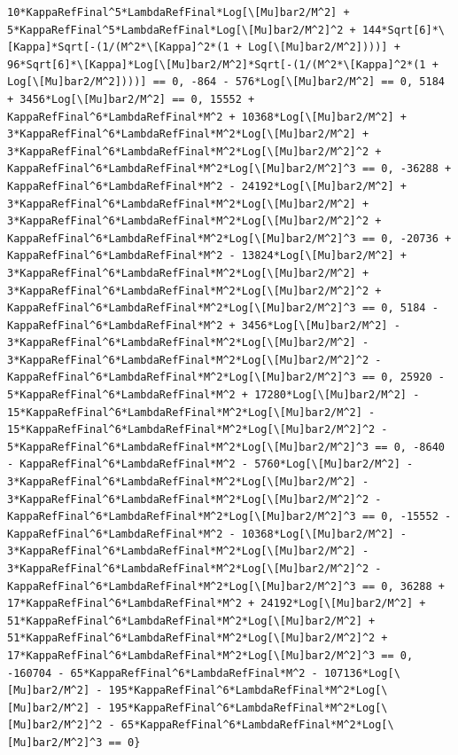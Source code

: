 \documentclass[11pt]{article}
\begin{document}
\begin{verbatim}
10*KappaRefFinal^5*LambdaRefFinal*Log[\[Mu]bar2/M^2] + 5*KappaRefFinal^5*LambdaRefFinal*Log[\[Mu]bar2/M^2]^2 + 144*Sqrt[6]*\[Kappa]*Sqrt[-(1/(M^2*\[Kappa]^2*(1 + Log[\[Mu]bar2/M^2])))] + 96*Sqrt[6]*\[Kappa]*Log[\[Mu]bar2/M^2]*Sqrt[-(1/(M^2*\[Kappa]^2*(1 + Log[\[Mu]bar2/M^2])))] == 0, -864 - 576*Log[\[Mu]bar2/M^2] == 0, 5184 + 3456*Log[\[Mu]bar2/M^2] == 0, 15552 + KappaRefFinal^6*LambdaRefFinal*M^2 + 10368*Log[\[Mu]bar2/M^2] + 3*KappaRefFinal^6*LambdaRefFinal*M^2*Log[\[Mu]bar2/M^2] + 3*KappaRefFinal^6*LambdaRefFinal*M^2*Log[\[Mu]bar2/M^2]^2 + KappaRefFinal^6*LambdaRefFinal*M^2*Log[\[Mu]bar2/M^2]^3 == 0, -36288 + KappaRefFinal^6*LambdaRefFinal*M^2 - 24192*Log[\[Mu]bar2/M^2] + 3*KappaRefFinal^6*LambdaRefFinal*M^2*Log[\[Mu]bar2/M^2] + 3*KappaRefFinal^6*LambdaRefFinal*M^2*Log[\[Mu]bar2/M^2]^2 + KappaRefFinal^6*LambdaRefFinal*M^2*Log[\[Mu]bar2/M^2]^3 == 0, -20736 + KappaRefFinal^6*LambdaRefFinal*M^2 - 13824*Log[\[Mu]bar2/M^2] + 3*KappaRefFinal^6*LambdaRefFinal*M^2*Log[\[Mu]bar2/M^2] + 3*KappaRefFinal^6*LambdaRefFinal*M^2*Log[\[Mu]bar2/M^2]^2 + KappaRefFinal^6*LambdaRefFinal*M^2*Log[\[Mu]bar2/M^2]^3 == 0, 5184 - KappaRefFinal^6*LambdaRefFinal*M^2 + 3456*Log[\[Mu]bar2/M^2] - 3*KappaRefFinal^6*LambdaRefFinal*M^2*Log[\[Mu]bar2/M^2] - 3*KappaRefFinal^6*LambdaRefFinal*M^2*Log[\[Mu]bar2/M^2]^2 - KappaRefFinal^6*LambdaRefFinal*M^2*Log[\[Mu]bar2/M^2]^3 == 0, 25920 - 5*KappaRefFinal^6*LambdaRefFinal*M^2 + 17280*Log[\[Mu]bar2/M^2] - 15*KappaRefFinal^6*LambdaRefFinal*M^2*Log[\[Mu]bar2/M^2] - 15*KappaRefFinal^6*LambdaRefFinal*M^2*Log[\[Mu]bar2/M^2]^2 - 5*KappaRefFinal^6*LambdaRefFinal*M^2*Log[\[Mu]bar2/M^2]^3 == 0, -8640 - KappaRefFinal^6*LambdaRefFinal*M^2 - 5760*Log[\[Mu]bar2/M^2] - 3*KappaRefFinal^6*LambdaRefFinal*M^2*Log[\[Mu]bar2/M^2] - 3*KappaRefFinal^6*LambdaRefFinal*M^2*Log[\[Mu]bar2/M^2]^2 - KappaRefFinal^6*LambdaRefFinal*M^2*Log[\[Mu]bar2/M^2]^3 == 0, -15552 - KappaRefFinal^6*LambdaRefFinal*M^2 - 10368*Log[\[Mu]bar2/M^2] - 3*KappaRefFinal^6*LambdaRefFinal*M^2*Log[\[Mu]bar2/M^2] - 3*KappaRefFinal^6*LambdaRefFinal*M^2*Log[\[Mu]bar2/M^2]^2 - KappaRefFinal^6*LambdaRefFinal*M^2*Log[\[Mu]bar2/M^2]^3 == 0, 36288 + 17*KappaRefFinal^6*LambdaRefFinal*M^2 + 24192*Log[\[Mu]bar2/M^2] + 51*KappaRefFinal^6*LambdaRefFinal*M^2*Log[\[Mu]bar2/M^2] + 51*KappaRefFinal^6*LambdaRefFinal*M^2*Log[\[Mu]bar2/M^2]^2 + 17*KappaRefFinal^6*LambdaRefFinal*M^2*Log[\[Mu]bar2/M^2]^3 == 0, -160704 - 65*KappaRefFinal^6*LambdaRefFinal*M^2 - 107136*Log[\[Mu]bar2/M^2] - 195*KappaRefFinal^6*LambdaRefFinal*M^2*Log[\[Mu]bar2/M^2] - 195*KappaRefFinal^6*LambdaRefFinal*M^2*Log[\[Mu]bar2/M^2]^2 - 65*KappaRefFinal^6*LambdaRefFinal*M^2*Log[\[Mu]bar2/M^2]^3 == 0}
\end{verbatim}
\end{document}
